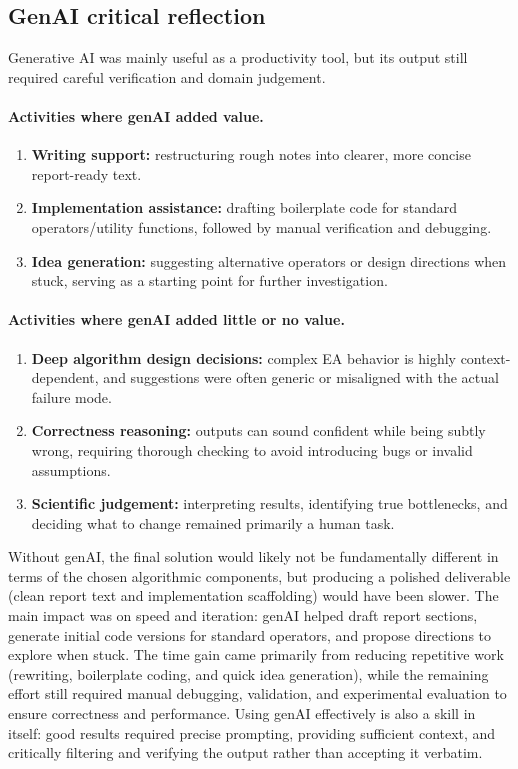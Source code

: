 \documentclass[a4paper,10pt]{article}
\begin{document}
\subsection{GenAI critical reflection}

Generative AI was mainly useful as a productivity tool, but its output still required careful verification and
domain judgement.

\paragraph{Activities where genAI added value.}
\begin{enumerate}
  \item \textbf{Writing support:} restructuring rough notes into clearer, more concise report-ready text.
  \item \textbf{Implementation assistance:} drafting boilerplate code for standard operators/utility functions, followed by manual verification and debugging.
  \item \textbf{Idea generation:} suggesting alternative operators or design directions when stuck, serving as a starting point for further investigation.
\end{enumerate}

\paragraph{Activities where genAI added little or no value.}
\begin{enumerate}
  \item \textbf{Deep algorithm design decisions:} complex EA behavior is highly context-dependent, and suggestions were often generic or misaligned with the actual failure mode.
  \item \textbf{Correctness reasoning:} outputs can sound confident while being subtly wrong, requiring thorough checking to avoid introducing bugs or invalid assumptions.
  \item \textbf{Scientific judgement:} interpreting results, identifying true bottlenecks, and deciding what to change remained primarily a human task.
\end{enumerate}

Without genAI, the final solution would likely not be fundamentally different in terms of the chosen algorithmic
components, but producing a polished deliverable (clean report text and implementation scaffolding) would have
been slower. The main impact was on speed and iteration: genAI helped draft report sections, generate initial
code versions for standard operators, and propose directions to explore when stuck. The time gain came primarily
from reducing repetitive work (rewriting, boilerplate coding, and quick idea generation), while the remaining
effort still required manual debugging, validation, and experimental evaluation to ensure correctness and
performance. Using genAI effectively is also a skill in itself: good results required precise prompting,
providing sufficient context, and critically filtering and verifying the output rather than accepting it
verbatim.
\end{document}
